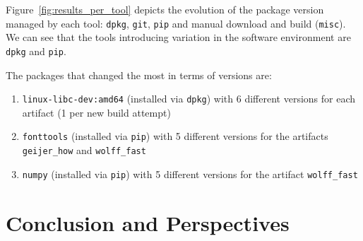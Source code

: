 \documentclass[sigconf,natbib=false]{acmart}
\begin{document}
Figure~\ref{fig:results_per_tool} depicts the evolution of the package version managed by each tool: \texttt{dpkg}, \texttt{git}, \texttt{pip} and manual download and build (\texttt{misc}).
We can see that the tools introducing variation in the software environment are \texttt{dpkg} and \texttt{pip}.

The packages that changed the most in terms of versions are:
\begin{enumerate}
\item \texttt{linux-libc-dev:amd64} (installed via \texttt{dpkg}) with 6 different versions for each artifact (1 per new build attempt)
\item \texttt{fonttools} (installed via \texttt{pip}) with 5 different versions for the artifacts \texttt{geijer\_how} and \texttt{wolff\_fast}
\item \texttt{numpy} (installed via \texttt{pip}) with 5 different versions for the artifact \texttt{wolff\_fast}
\end{enumerate}


\section{Conclusion and Perspectives}
\end{document}
